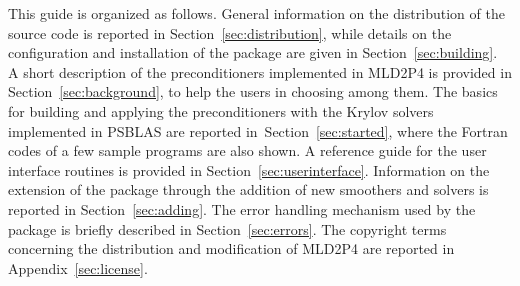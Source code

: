 This guide is organized as follows. General information on the distribution of the source
code is reported in Section~\ref{sec:distribution}, while details on the configuration
and installation of the package are given in Section~\ref{sec:building}. A short description
of the preconditioners implemented in MLD2P4 is provided in Section~\ref{sec:background},
to help the users in choosing among them. The basics for building and applying the
preconditioners with the Krylov solvers implemented in PSBLAS are reported 
in~Section~\ref{sec:started}, where the Fortran codes of a few sample programs
are also shown. A reference guide for the user interface routines is provided
in Section~\ref{sec:userinterface}. Information on the extension of the package
through the addition of new smoothers and solvers is reported in Section~\ref{sec:adding}. 
The error handling mechanism used by the package
is briefly described in Section~\ref{sec:errors}. The copyright terms concerning the
distribution and modification of MLD2P4 are reported in Appendix~\ref{sec:license}.

